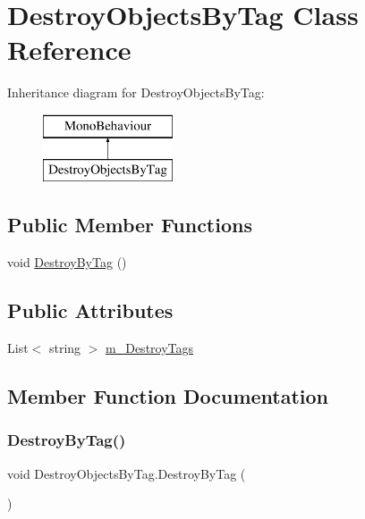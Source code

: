 \hypertarget{class_destroy_objects_by_tag}{}\section{Destroy\+Objects\+By\+Tag Class Reference}
\label{class_destroy_objects_by_tag}
Inheritance diagram for Destroy\+Objects\+By\+Tag\+:\begin{figure}[H]
\begin{center}
\leavevmode
\includegraphics[height=2.000000cm]{class_destroy_objects_by_tag}
\end{center}
\end{figure}
\subsection*{Public Member Functions}
\begin{DoxyCompactItemize}
\item 
void \mbox{\hyperlink{class_destroy_objects_by_tag_a32509b32198d959d557f2b7d274fa3d5}{Destroy\+By\+Tag}} ()
\end{DoxyCompactItemize}
\subsection*{Public Attributes}
\begin{DoxyCompactItemize}
\item 
List$<$ string $>$ \mbox{\hyperlink{class_destroy_objects_by_tag_a2776935369c22f6d6d44fa7bbd704c35}{m\+\_\+\+Destroy\+Tags}}
\end{DoxyCompactItemize}


\subsection{Member Function Documentation}
\mbox{\label{class_destroy_objects_by_tag_a32509b32198d959d557f2b7d274fa3d5}} 
\subsubsection{\texorpdfstring{DestroyByTag()}{DestroyByTag()}}
{\footnotesize\ttfamily void Destroy\+Objects\+By\+Tag.\+Destroy\+By\+Tag (\begin{DoxyParamCaption}{ }\end{DoxyParamCaption})}



